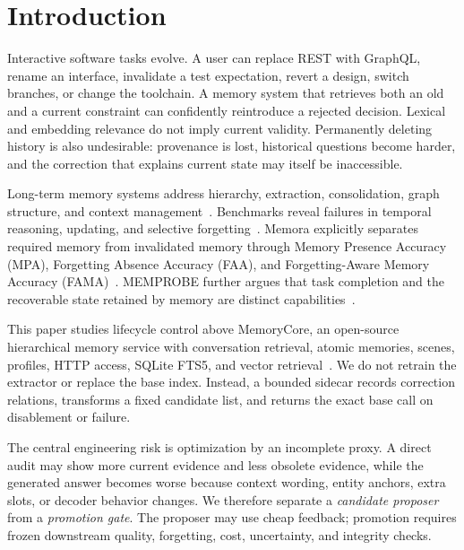 \documentclass[10pt]{article}
\begin{document}
\section{Introduction}

Interactive software tasks evolve. A user can replace REST with GraphQL, rename an interface, invalidate a test expectation, revert a design, switch branches, or change the toolchain. A memory system that retrieves both an old and a current constraint can confidently reintroduce a rejected decision. Lexical and embedding relevance do not imply current validity. Permanently deleting history is also undesirable: provenance is lost, historical questions become harder, and the correction that explains current state may itself be inaccessible.

Long-term memory systems address hierarchy, extraction, consolidation, graph structure, and context management~\cite{packer2023memgpt,xu2025amem,chhikara2025mem0,rasmussen2025zep}. Benchmarks reveal failures in temporal reasoning, updating, and selective forgetting~\cite{maharana2024locomo,wu2024longmemeval,hu2026memoryagentbench}. Memora explicitly separates required memory from invalidated memory through Memory Presence Accuracy (MPA), Forgetting Absence Accuracy (FAA), and Forgetting-Aware Memory Accuracy (FAMA)~\cite{uddin2026memora}. MEMPROBE further argues that task completion and the recoverable state retained by memory are distinct capabilities~\cite{ma2026memprobe}.

This paper studies lifecycle control above MemoryCore, an open-source hierarchical memory service with conversation retrieval, atomic memories, scenes, profiles, HTTP access, SQLite FTS5, and vector retrieval~\cite{memorycore2026}. We do not retrain the extractor or replace the base index. Instead, a bounded sidecar records correction relations, transforms a fixed candidate list, and returns the exact base call on disablement or failure.

The central engineering risk is optimization by an incomplete proxy. A direct audit may show more current evidence and less obsolete evidence, while the generated answer becomes worse because context wording, entity anchors, extra slots, or decoder behavior changes. We therefore separate a \emph{candidate proposer} from a \emph{promotion gate}. The proposer may use cheap feedback; promotion requires frozen downstream quality, forgetting, cost, uncertainty, and integrity checks.
\end{document}
